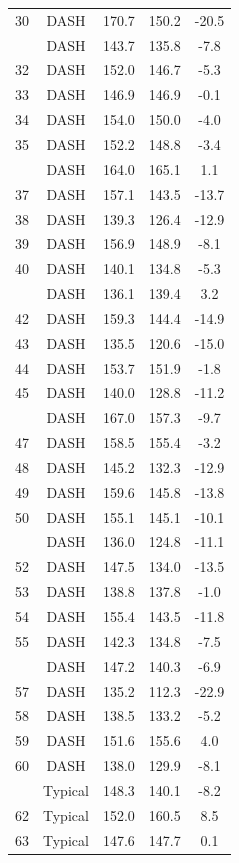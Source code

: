 \documentclass[
]{book}
\begin{document}
\begin{table}[!h]
{\begin{tabular}[t]{ccccc}
30 & DASH & 170.7 & 150.2 & -20.5\\
\addlinespace
31 & DASH & 143.7 & 135.8 & -7.8\\
32 & DASH & 152.0 & 146.7 & -5.3\\
33 & DASH & 146.9 & 146.9 & -0.1\\
34 & DASH & 154.0 & 150.0 & -4.0\\
35 & DASH & 152.2 & 148.8 & -3.4\\
\addlinespace
36 & DASH & 164.0 & 165.1 & 1.1\\
37 & DASH & 157.1 & 143.5 & -13.7\\
38 & DASH & 139.3 & 126.4 & -12.9\\
39 & DASH & 156.9 & 148.9 & -8.1\\
40 & DASH & 140.1 & 134.8 & -5.3\\
\addlinespace
41 & DASH & 136.1 & 139.4 & 3.2\\
42 & DASH & 159.3 & 144.4 & -14.9\\
43 & DASH & 135.5 & 120.6 & -15.0\\
44 & DASH & 153.7 & 151.9 & -1.8\\
45 & DASH & 140.0 & 128.8 & -11.2\\
\addlinespace
46 & DASH & 167.0 & 157.3 & -9.7\\
47 & DASH & 158.5 & 155.4 & -3.2\\
48 & DASH & 145.2 & 132.3 & -12.9\\
49 & DASH & 159.6 & 145.8 & -13.8\\
50 & DASH & 155.1 & 145.1 & -10.1\\
\addlinespace
51 & DASH & 136.0 & 124.8 & -11.1\\
52 & DASH & 147.5 & 134.0 & -13.5\\
53 & DASH & 138.8 & 137.8 & -1.0\\
54 & DASH & 155.4 & 143.5 & -11.8\\
55 & DASH & 142.3 & 134.8 & -7.5\\
\addlinespace
56 & DASH & 147.2 & 140.3 & -6.9\\
57 & DASH & 135.2 & 112.3 & -22.9\\
58 & DASH & 138.5 & 133.2 & -5.2\\
59 & DASH & 151.6 & 155.6 & 4.0\\
60 & DASH & 138.0 & 129.9 & -8.1\\
\addlinespace
61 & Typical & 148.3 & 140.1 & -8.2\\
62 & Typical & 152.0 & 160.5 & 8.5\\
63 & Typical & 147.6 & 147.7 & 0.1\\

\end{tabular}}
\end{table}
\end{document}

